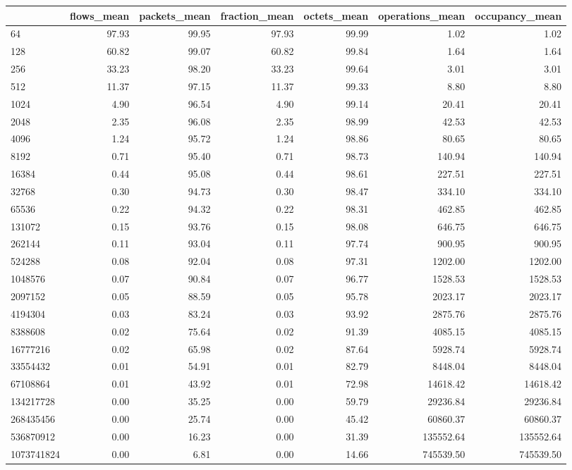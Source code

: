 \begin{tabular}{lrrrrrr}
\toprule
 & flows_mean & packets_mean & fraction_mean & octets_mean & operations_mean & occupancy_mean \\
\midrule
64 & 97.93 & 99.95 & 97.93 & 99.99 & 1.02 & 1.02 \\
128 & 60.82 & 99.07 & 60.82 & 99.84 & 1.64 & 1.64 \\
256 & 33.23 & 98.20 & 33.23 & 99.64 & 3.01 & 3.01 \\
512 & 11.37 & 97.15 & 11.37 & 99.33 & 8.80 & 8.80 \\
1024 & 4.90 & 96.54 & 4.90 & 99.14 & 20.41 & 20.41 \\
2048 & 2.35 & 96.08 & 2.35 & 98.99 & 42.53 & 42.53 \\
4096 & 1.24 & 95.72 & 1.24 & 98.86 & 80.65 & 80.65 \\
8192 & 0.71 & 95.40 & 0.71 & 98.73 & 140.94 & 140.94 \\
16384 & 0.44 & 95.08 & 0.44 & 98.61 & 227.51 & 227.51 \\
32768 & 0.30 & 94.73 & 0.30 & 98.47 & 334.10 & 334.10 \\
65536 & 0.22 & 94.32 & 0.22 & 98.31 & 462.85 & 462.85 \\
131072 & 0.15 & 93.76 & 0.15 & 98.08 & 646.75 & 646.75 \\
262144 & 0.11 & 93.04 & 0.11 & 97.74 & 900.95 & 900.95 \\
524288 & 0.08 & 92.04 & 0.08 & 97.31 & 1202.00 & 1202.00 \\
1048576 & 0.07 & 90.84 & 0.07 & 96.77 & 1528.53 & 1528.53 \\
2097152 & 0.05 & 88.59 & 0.05 & 95.78 & 2023.17 & 2023.17 \\
4194304 & 0.03 & 83.24 & 0.03 & 93.92 & 2875.76 & 2875.76 \\
8388608 & 0.02 & 75.64 & 0.02 & 91.39 & 4085.15 & 4085.15 \\
16777216 & 0.02 & 65.98 & 0.02 & 87.64 & 5928.74 & 5928.74 \\
33554432 & 0.01 & 54.91 & 0.01 & 82.79 & 8448.04 & 8448.04 \\
67108864 & 0.01 & 43.92 & 0.01 & 72.98 & 14618.42 & 14618.42 \\
134217728 & 0.00 & 35.25 & 0.00 & 59.79 & 29236.84 & 29236.84 \\
268435456 & 0.00 & 25.74 & 0.00 & 45.42 & 60860.37 & 60860.37 \\
536870912 & 0.00 & 16.23 & 0.00 & 31.39 & 135552.64 & 135552.64 \\
1073741824 & 0.00 & 6.81 & 0.00 & 14.66 & 745539.50 & 745539.50 \\
\bottomrule
\end{tabular}
